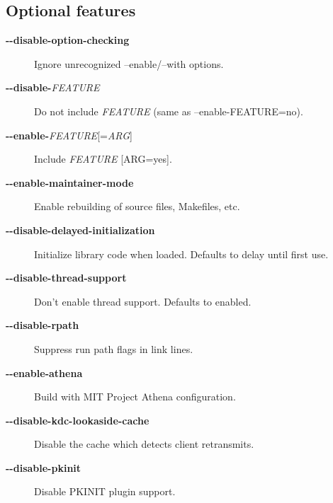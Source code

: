 \documentclass[letterpaper,10pt,english]{sphinxmanual}
\begin{document}
\subsection{Optional features}
\label{build/options2configure:optional-features}\begin{description}
\item[{\textbf{-}\textbf{-disable-option-checking}}] \leavevmode
Ignore unrecognized --enable/--with options.

\item[{\textbf{-}\textbf{-disable-}\emph{FEATURE}}] \leavevmode
Do not include \emph{FEATURE} (same as --enable-FEATURE=no).

\item[{\textbf{-}\textbf{-enable-}\emph{FEATURE}{[}=\emph{ARG}{]}}] \leavevmode
Include \emph{FEATURE} {[}ARG=yes{]}.

\item[{\textbf{-}\textbf{-enable-maintainer-mode}}] \leavevmode
Enable rebuilding of source files, Makefiles, etc.

\item[{\textbf{-}\textbf{-disable-delayed-initialization}}] \leavevmode
Initialize library code when loaded.  Defaults to delay until
first use.

\item[{\textbf{-}\textbf{-disable-thread-support}}] \leavevmode
Don't enable thread support.  Defaults to enabled.

\item[{\textbf{-}\textbf{-disable-rpath}}] \leavevmode
Suppress run path flags in link lines.

\item[{\textbf{-}\textbf{-enable-athena}}] \leavevmode
Build with MIT Project Athena configuration.

\item[{\textbf{-}\textbf{-disable-kdc-lookaside-cache}}] \leavevmode
Disable the cache which detects client retransmits.

\item[{\textbf{-}\textbf{-disable-pkinit}}] \leavevmode
Disable PKINIT plugin support.

\end{description}
\end{document}

